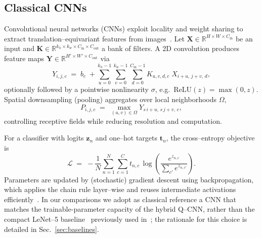 \subsection{Classical CNNs}\label{sec:classical-cnns}
Convolutional neural networks (CNNs) exploit locality and weight sharing to extract
translation–equivariant features from images~\cite{Goodfellow2016,LeCun1998}.
Let $\mathbf{X}\!\in\!\mathbb{R}^{H\times W\times C_{\mathrm{in}}}$ be an input and
$\mathbf{K}\!\in\!\mathbb{R}^{k_h\times k_w\times C_{\mathrm{in}}\times C_{\mathrm{out}}}$ a bank of filters.
A 2D convolution produces feature maps $\mathbf{Y}\in\mathbb{R}^{H'\times W'\times C_{\mathrm{out}}}$
via
\begin{equation}
Y_{i,j,c} \;=\; b_c \;+\!
\sum_{u=0}^{k_h-1}\sum_{v=0}^{k_w-1}\sum_{d=0}^{C_{\mathrm{in}}-1}
K_{u,v,d,c}\; X_{i+u,\,j+v,\,d},
\label{eq:conv2d}
\end{equation}
optionally followed by a pointwise nonlinearity $\sigma$, e.g.\ $\mathrm{ReLU}(z)=\max(0,z)$.
Spatial downsampling (pooling) aggregates over local neighborhoods $\Omega$,
\begin{equation}
P_{i,j,c} \;=\; \max_{(u,v)\in\Omega} Y_{s\,i+u,\,s\,j+v,\,c},
\end{equation}
controlling receptive fields while reducing resolution and computation.

For a classifier with logits $\mathbf{z}_n$ and one–hot targets $\mathbf{t}_n$, the cross–entropy objective is
\begin{equation}
\mathcal{L} \;=\; -\frac{1}{N}\sum_{n=1}^{N}\sum_{c=1}^{C}
t_{n,c}\,\log\!\left(\frac{e^{z_{n,c}}}{\sum_{c'} e^{z_{n,c'}}}\right).
\end{equation}
Parameters are updated by (stochastic) gradient descent using backpropagation,
which applies the chain rule layer–wise and reuses intermediate activations efficiently~\cite{Goodfellow2016}.
In our comparisons we adopt as classical reference a CNN that matches the trainable-parameter capacity of the hybrid Q--CNN, rather than the compact LeNet--5 baseline~\cite{LeCun1998} previously used in~\cite{Filippi2025Thesis}; the rationale for this choice is detailed in Sec.~\ref{sec:baselines}.



